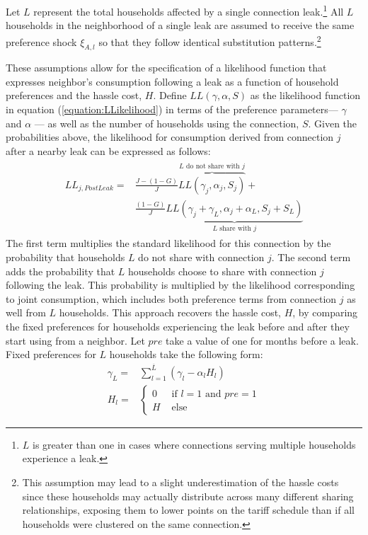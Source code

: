 \documentclass[12pt]{article}
\begin{document}
Let $L$ represent the total households affected by a single connection leak.\footnote{$L$ is greater than one in cases where connections serving multiple households experience a leak.}  All $L$ households in the neighborhood of a single leak are assumed to receive the same preference shock $\xi_{A,l}$ so that they follow identical substitution patterns.\footnote{This assumption may lead to a slight underestimation of the hassle costs since these households may actually distribute across many different sharing relationships, exposing them to lower points on the tariff schedule than if all households were clustered on the same connection.}

These assumptions allow for the specification of a likelihood function that expresses neighbor's consumption following a leak as a function of household preferences and the hassle cost, $H$.  Define $LL(\gamma,\alpha,S)$ as the likelihood function in equation (\ref{equation:LLikelihood}) in terms of the preference parameters--- $\gamma$ and $\alpha$ --- as well as the number of households using the connection, $S$.  Given the probabilities above, the likelihood for consumption derived from connection $j$ after a nearby leak can be expressed as follows:
\begin{align}\label{equation:hasslelikelihood}
\begin{split}
LL_{j,PostLeak} = & \frac{J-(1-G)}{J} \overbrace{LL(\gamma_j,\alpha_j,S_j)}^{\text{$L$ do not share with $j$}} + \\
	    & \frac{(1-G)}{J}  \underbrace{LL(\gamma_j + \gamma_{L},\alpha_j+\alpha_{L},S_j+S_L)}_{\text{$L$ share with $j$}}
\end{split}
\end{align}
The first term multiplies the standard likelihood for this connection by the probability that households $L$ do not share with connection $j$.  The second term adds the probability that $L$ households choose to share with connection $j$ following the leak.  This probability is multiplied by the likelihood corresponding to joint consumption, which includes both preference terms from connection $j$ as well from $L$ households.  This approach recovers the hassle cost, $H$, by comparing the fixed preferences for households experiencing the leak before and after they start using from a neighbor.  Let $pre$ take a value of one for months before a leak.  Fixed preferences for $L$ households take the following form:
\begin{align*}
\gamma_{L} = &  \sum_{l=1}^{\overline{L}} ( \gamma_{l} - \alpha_{l} H_l ) \\
H_{l} = & 
	\begin{cases}
	0     &  \text{ if } l=1 \text{ and } pre=1 \\
	H   &  \text{ else }
	\end{cases}
\end{align*}
\end{document}
